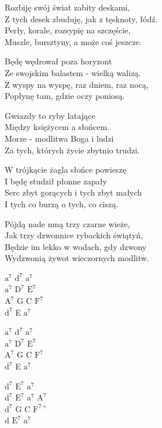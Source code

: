 \begin{text}
    Rozbiję swój świat zabity deskami,\\
    Z tych desek zbuduję, jak z tęsknoty, łódź.\\
    Perły, korale, rozsypię na szczęście,\\
    Muszle, bursztyny, a może coś jeszcze.

    Będę wędrował poza horyzont\\
    Ze swojskim balastem - wielką walizą.\\
    Z wyspy na wyspę, raz dniem, raz nocą,\\
    Popłynę tam, gdzie oczy poniosą.

    \vin Gwiazdy to ryby latające\\
    \vin Między księżycem a słońcem.\\
    \vin Morze - modlitwa Boga i ludzi\\
    \vin Za tych, których życie zbytnio trudzi.

    W trójkącie żagla słońce powieszę\\
    I będę studził płonne zapały\\
    Serc zbyt gorących i tych zbyt małych\\
    I tych co burzą o tych, co ciszą.

    Pójdą nade mną trzy czarne wieże,\\
    Jak trzy dzwonnice rybackich świątyń,\\
    Będzie im lekko w wodach, gdy dzwony\\
    Wydzwonią żywot wieczornych modlitw.
\end{text}
\begin{chord}
    $\mathrm{a^{7}}$ $\mathrm{d^{7}}$ $\mathrm{a^{7}}$\\
    $\mathrm{a^{7}}$ $\mathrm{D^{7}}$ $\mathrm{E^{7}}$\\
    $\mathrm{A^{7}}$ G C $\mathrm{F^{7}}$\\
    $\mathrm{d^{7}}$ E $\mathrm{a^{7}}$

    $\mathrm{a^{7}}$ $\mathrm{d^{7}}$ $\mathrm{a^{7}}$\\
    $\mathrm{a^{7}}$ $\mathrm{D^{7}}$ $\mathrm{E^{7}}$\\
    $\mathrm{A^{7}}$ G C $\mathrm{F^{7}}$\\
    $\mathrm{d^{7}}$ E $\mathrm{a^{7}}$

    $\mathrm{d^{7}}$ $\mathrm{E^{7}}$ $\mathrm{a^{7}}$\\
    $\mathrm{d^{7}}$ $\mathrm{E^{7}}$ $\mathrm{a^{7}}$ $\mathrm{A^{7}}$\\
    $\mathrm{d^{7}}$ G C $\mathrm{F^{7+}}$\\
    d $\mathrm{E^{7}}$ $\mathrm{a^{7}}$
\end{chord}
